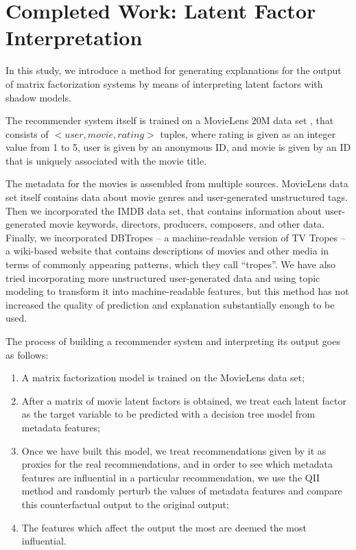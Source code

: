 \chapter{Completed Work: Latent Factor Interpretation}

In this study, we introduce a method for generating explanations for the
output of matrix factorization systems by means of interpreting latent factors
with shadow models.

The recommender system itself is trained on a MovieLens 20M data set
\cite{data-movielens}, that consists of $<user,movie,rating>$ tuples, where
rating is given as an integer value from 1 to 5, user is given by an anonymous
ID, and movie is given by an ID that is uniquely associated with the movie
title.

The metadata for the movies is assembled from multiple sources. MovieLens data
set itself contains data about movie genres and user-generated unstructured
tags. Then we incorporated the IMDB data set\cite{data-imdb}, that contains
information about user-generated movie keywords, directors, producers,
composers, and other data. Finally, we incorporated DBTropes\cite{data-dbtropes}
-- a machine-readable version of TV Tropes -- a wiki-based website that contains
descriptions of movies and other media in terms of commonly appearing patterns,
which they call ``tropes''. We have also tried incorporating more unstructured
user-generated data and using topic modeling to transform it into
machine-readable features, but this method has not increased the quality of
prediction and explanation substantially enough to be used.

The process of building a recommender system and interpreting its output goes
as follows:

\begin{enumerate}
	\item
		A matrix factorization model is trained on the MovieLens data
		set;
	\item
		After a matrix of movie latent factors is obtained, we treat
		each latent factor as the target variable to be predicted with
		a decision tree model from metadata features;
	\item
		Once we have built this model, we treat recommendations given by
		it as proxies for the real recommendations, and in order to see
		which metadata features are influential in a particular
		recommendation, we use the QII method and randomly perturb the
		values of metadata features and compare this counterfactual
		output to the original output;
	\item
		The features which affect the output the most are deemed the
		most influential.
\end{enumerate}

